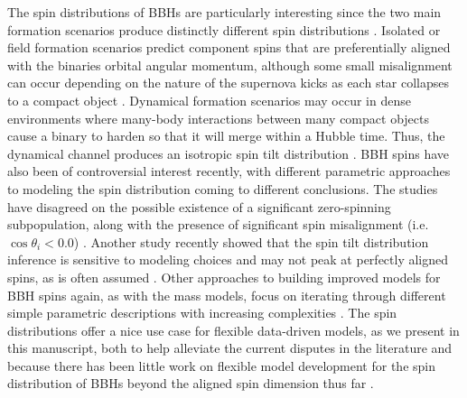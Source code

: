The spin distributions of BBHs are particularly interesting since the two main formation scenarios produce distinctly different spin distributions . 
Isolated or field formation scenarios predict component spins that are preferentially aligned with the binaries orbital angular momentum, although some small 
misalignment can occur depending on the nature of the supernova kicks as each star collapses to a compact object . Dynamical formation scenarios may occur in 
dense environments where many-body interactions between many compact objects cause a binary to harden so that it will merge within a Hubble time. Thus, the dynamical 
channel produces an isotropic spin tilt distribution . BBH spins have also been of controversial interest recently, with different parametric approaches to modeling 
the spin distribution coming to different conclusions. The studies have disagreed on the possible existence of a significant zero-spinning subpopulation, along with the presence of 
significant spin misalignment (i.e. $\cos{\theta_i} < 0.0$) \citep{o3b_astro_dist,RouletGWTC2Pop,BuildBetterSpinModels,GWTC3MonashSpin,Callister_NoEvidence}. 
Another study recently showed that the spin tilt distribution inference is sensitive to modeling choices and may not peak at perfectly aligned spins, as is often assumed \citep{spinitasyoulike}. 
Other approaches to building improved models for BBH spins again, as with the mass models, focus on iterating through different simple parametric descriptions with 
increasing complexities \citep{BuildBetterSpinModels,Callister_NoEvidence,spinitasyoulike}. The spin distributions offer a nice use case for flexible data-driven models, as 
we present in this manuscript, both to help alleviate the current disputes in the literature and because there has been little work on flexible model development for the 
spin distribution of BBHs beyond the aligned spin dimension thus far \citep{Tiwari_2021_a,Tiwari_2021_b}.

